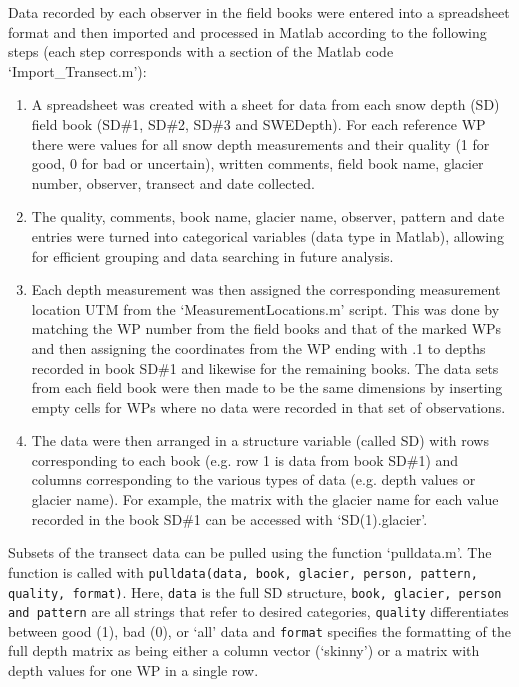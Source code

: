 \documentclass{sfuthesis}
\begin{document}
{\begin{appendices}
Data recorded by each observer in the field books were entered into a spreadsheet format and then imported and processed in Matlab according to the following steps (each step corresponds with a section of the Matlab code `Import\_Transect.m'):
\begin{enumerate}
	\item A spreadsheet was created with a sheet for data from each snow depth (SD) field book (SD\#1, SD\#2, SD\#3 and SWEDepth). For each reference WP there were values for all snow depth measurements and their quality (1 for good, 0 for bad or uncertain), written comments, field book name, glacier number, observer, transect and date collected.  
	\item The quality, comments, book name, glacier name, observer, pattern and date entries were turned into categorical variables (data type in Matlab), allowing for efficient grouping and data searching in future analysis.
	\item Each depth measurement was then assigned the corresponding measurement location UTM from the `MeasurementLocations.m' script. This was done by matching the WP number from the field books and that of the marked WPs and then assigning the coordinates from the WP ending with .1 to depths recorded in book SD\#1 and likewise for the remaining books. The data sets from each field book were then made to be the same dimensions by inserting empty cells for WPs where no data were recorded in that set of observations. 
	\item The data were then arranged in a structure variable (called SD) with rows corresponding to each book (e.g. row 1 is data from book SD\#1) and columns corresponding to the various types of data (e.g. depth values or glacier name). For example, the matrix with the glacier name for each value recorded in the book SD\#1 can be accessed with `SD(1).glacier'.
\end{enumerate}

Subsets of the transect data can be pulled using the function `pulldata.m'. The function is called with \texttt{pulldata(data, book, glacier, person, pattern, quality, format)}. Here, \texttt{data} is the full SD structure, \texttt{book, glacier, person and pattern} are all strings that refer to desired categories, \texttt{quality} differentiates between good (1), bad (0), or `all' data and \texttt{format} specifies the formatting of the full depth matrix as being either a column vector (`skinny') or a matrix with depth values for one WP in a single row. 


\end{appendices}}
\end{document}
